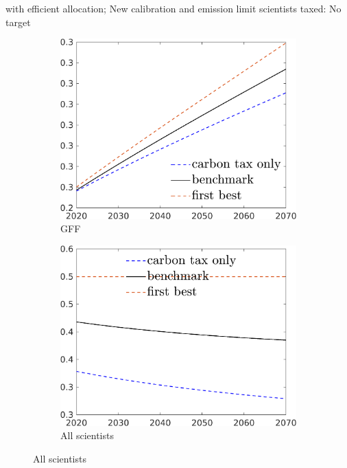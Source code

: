 \documentclass[11pt,aspectratio=169]{beamer}
\begin{document}
\begin{frame}{with efficient allocation; New calibration and emission limit scientists taxed: No target}
	\begin{figure}[h!!]
		\centering
		\begin{subfigure}{0.3\textwidth}		
			\caption{{GFF}}
			\includegraphics[width=1\textwidth]{../codding_model/own_basedOnFried/optimalPol_010922_revision/figures/all_13Sept22/NewCalib_eff2pol_NoT_GFF_Sun2_emnet1_spillover0_knspil3_xgr0_nsk0_sep0_extern0_PV1_etaa0.79_lgd1.png}
		\end{subfigure}
		\begin{subfigure}{0.3\textwidth}		
			\caption{{All scientists}}
			\includegraphics[width=1\textwidth]{../codding_model/own_basedOnFried/optimalPol_010922_revision/figures/all_13Sept22/NewCalib_eff2pol_NoT_S_Sun2_emnet1_spillover0_knspil3_xgr0_nsk0_sep0_extern0_PV1_etaa0.79_lgd1.png}

\end{subfigure}
\end{figure}
\end{frame}
\end{document}
